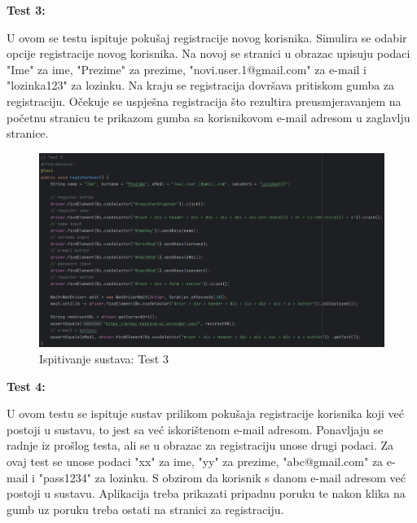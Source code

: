 		 	\textbf{Test 3:}
		 	
		 	U ovom se testu ispituje pokušaj registracije novog korisnika. Simulira se odabir opcije registracije novog korisnika. Na novoj se stranici u obrazac upisuju podaci "Ime" za ime, "Prezime" za prezime, "novi.user.1@gmail.com" za e-mail i "lozinka123" za lozinku. Na kraju se registracija dovršava pritiskom gumba za registraciju. Očekuje se uspješna registracija što rezultira preusmjeravanjem na početnu stranicu te prikazom gumba sa korisnikovom e-mail adresom u zaglavlju stranice.
		 	
		 	\begin{figure}[H]
		 		\includegraphics[width=\textwidth]{slike/SeleniumTest3.png} %
		 		\caption{Ispitivanje sustava: Test 3}
		 		\label{fig:SeleniumTest3} %
		 	\end{figure}
		 	
		 	\textbf{Test 4:}
		 	
		 	U ovom testu se ispituje sustav prilikom pokušaja registracije korisnika koji već postoji u sustavu, to jest sa već iskorištenom e-mail adresom. Ponavljaju se radnje iz prošlog testa, ali se u obrazac za registraciju unose drugi podaci. Za ovaj test se unose podaci "xx" za ime, "yy" za prezime, "abc@gmail.com" za e-mail i "pass1234" za lozinku. S obzirom da korisnik s danom e-mail adresom već postoji u sustavu. Aplikacija treba prikazati pripadnu poruku te nakon klika na gumb uz poruku treba ostati na stranici za registraciju.
		 	
